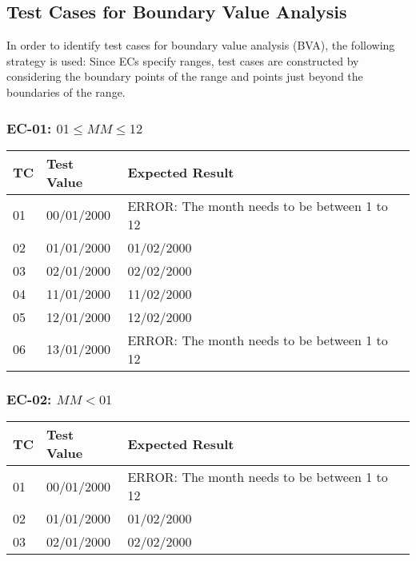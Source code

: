 \documentclass[11pt, oneside]{article}   	%
\begin{document}
\newpage
\subsection{Test Cases for Boundary Value Analysis}
In order to identify test cases for boundary value analysis (BVA), the following strategy is used: Since ECs specify ranges, test cases are constructed by considering the boundary points of the range and points just beyond the boundaries of the range.

\subsubsection{EC-01: $01 \leq MM \leq 12$}
\begin{table}[H]
\begin{tabular}{|l|l|l|}
\hline
TC & Test Value & Expected Result                              \\ \hline
01 & 00/01/2000 & ERROR: The month needs to be between 1 to 12 \\ \hline
02 & 01/01/2000 & 01/02/2000                                   \\ \hline
03 & 02/01/2000 & 02/02/2000                                   \\ \hline
04 & 11/01/2000 & 11/02/2000                                   \\ \hline
05 & 12/01/2000 & 12/02/2000                                   \\ \hline
06 & 13/01/2000 & ERROR: The month needs to be between 1 to 12 \\ \hline
\end{tabular}
\end{table}

\subsubsection{EC-02: $MM < 01$}
\begin{table}[H]
\begin{tabular}{|l|l|l|}
\hline
TC & Test Value & Expected Result                              \\ \hline
01 & 00/01/2000 & ERROR: The month needs to be between 1 to 12 \\ \hline
02 & 01/01/2000 & 01/02/2000                                   \\ \hline
03 & 02/01/2000 & 02/02/2000                                   \\ \hline
\end{tabular}
\end{table}
\end{document}

